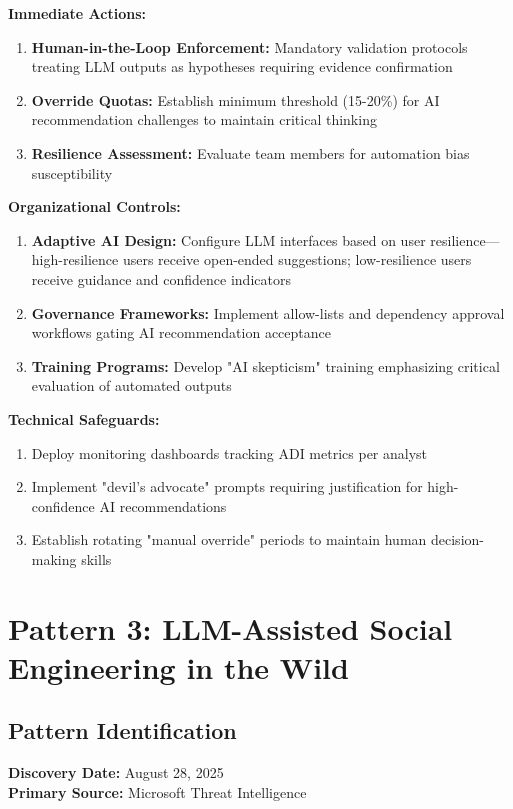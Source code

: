 \documentclass[11pt,a4paper]{article}
\begin{document}
\textbf{Immediate Actions:}
\begin{enumerate}
\item \textbf{Human-in-the-Loop Enforcement:} Mandatory validation protocols treating LLM outputs as hypotheses requiring evidence confirmation
\item \textbf{Override Quotas:} Establish minimum threshold (15-20\%) for AI recommendation challenges to maintain critical thinking
\item \textbf{Resilience Assessment:} Evaluate team members for automation bias susceptibility
\end{enumerate}

\textbf{Organizational Controls:}
\begin{enumerate}
\item \textbf{Adaptive AI Design:} Configure LLM interfaces based on user resilience—high-resilience users receive open-ended suggestions; low-resilience users receive guidance and confidence indicators
\item \textbf{Governance Frameworks:} Implement allow-lists and dependency approval workflows gating AI recommendation acceptance
\item \textbf{Training Programs:} Develop "AI skepticism" training emphasizing critical evaluation of automated outputs
\end{enumerate}

\textbf{Technical Safeguards:}
\begin{enumerate}
\item Deploy monitoring dashboards tracking ADI metrics per analyst
\item Implement "devil's advocate" prompts requiring justification for high-confidence AI recommendations
\item Establish rotating "manual override" periods to maintain human decision-making skills
\end{enumerate}

\section{Pattern 3: LLM-Assisted Social Engineering in the Wild}

\subsection{Pattern Identification}

\textbf{Discovery Date:} August 28, 2025\\
\textbf{Primary Source:} Microsoft Threat Intelligence\cite{microsoft2025svg}
\end{document}
